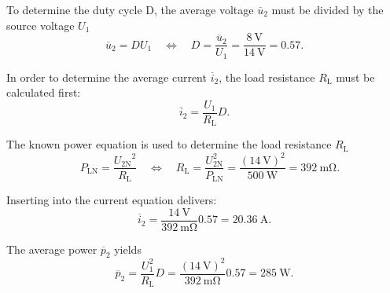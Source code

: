 \begin {solutionblock}
To determine the duty cycle D, the average voltage $\overline u_2$  must be divided by the source voltage $U_1$
\begin{equation}
	\overline u_2 = D U_1 \quad \Leftrightarrow \quad D = \frac{\overline u_2}{U_1} = \frac{\SI{8}{\volt}}{\SI{14}{\volt}}=0.57.
\end{equation}

In order to determine the average current $\overline i_2$, the load resistance $R_{\mathrm{L}}$ must be calculated first:
\begin{equation}
	\overline i_2 = \frac{U_1}{ R_{\mathrm{L}}}  D.
\end{equation}

The known power equation is used to determine the load resistance $R_{\mathrm{L}}$
\begin{equation}
	\quad  P_{\mathrm{LN}} = \frac{{ U_{\mathrm{2N}}}^2}{ R_{\mathrm{L}}} \quad
	\Leftrightarrow \quad R_{\mathrm{L}} = \frac{ U_{\mathrm{2N}}^2}{ P_{\mathrm{LN}}} = \frac{(\SI{14}{\volt})^2}{\SI{500}{\watt}} = \SI{392}{\milli\ohm}.
\end{equation}

Inserting into the current equation delivers:
$$\overline i_2 = \frac{\SI{14}{\volt}}{\SI{392}{\milli\ohm}} 0.57 =  \SI{20.36}{\ampere}.$$

The average power $\overline{p}_{\mathrm{2}}$ yields
\begin{equation}
	\overline{p}_{\mathrm{2}} = \frac{U_1^2}{ R_{\mathrm{L}}}  D = \frac{(\SI{14}{\volt})^2}{\SI{392}{\milli\ohm}}  0.57 = \SI{285}{\watt}.
\end{equation}
\end{solutionblock}

